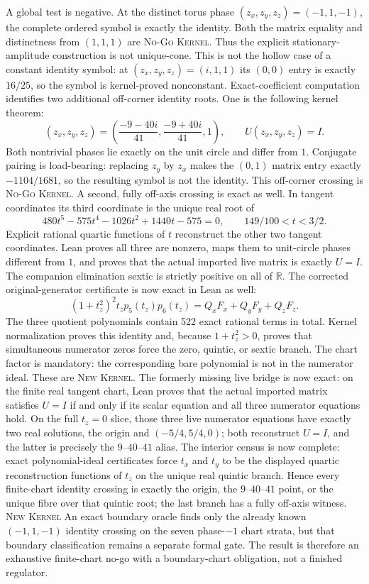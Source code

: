 \documentclass[11pt]{article}
\newcommand{\Kernel}{\textcolor{kernelcolor}{\textsc{Kernel}}}
\newcommand{\NewResult}{\textsc{New}}
\newcommand{\NoGo}{\textsc{No-Go}}
\begin{document}
A global test is negative.  At the distinct torus phase
$(z_x,z_y,z_z)=(-1,1,-1)$, the complete ordered symbol is exactly the identity.
Both the matrix equality and distinctness from $(1,1,1)$ are \NoGo{}
\Kernel{}.  Thus the explicit stationary-amplitude construction is not
unique-cone.  This is not the hollow case of a constant identity symbol: at
$(z_x,z_y,z_z)=(i,1,1)$ its $(0,0)$ entry is exactly $16/25$, so the symbol is
kernel-proved nonconstant.  Exact-coefficient computation identifies two
additional off-corner identity roots.  One is the following kernel theorem:
\[
 (z_x,z_y,z_z)=
 \left(\frac{-9-40i}{41},\frac{-9+40i}{41},1\right),
 \qquad U(z_x,z_y,z_z)=I.
\]
Both nontrivial phases lie exactly on the unit circle and differ from $1$.
Conjugate pairing is load-bearing: replacing $z_y$ by $z_x$ makes the
$(0,1)$ matrix entry exactly $-1104/1681$, so the resulting symbol is not the
identity.  This off-corner crossing is \NoGo{} \Kernel{}.  A second, fully
off-axis crossing is exact as well.  In tangent coordinates its third
coordinate is the unique real root of
\[
  480t^5-575t^4-1026t^2+1440t-575=0,
  \qquad 149/100<t<3/2.
\]
Explicit rational quartic functions of $t$ reconstruct the other two tangent
coordinates.  Lean proves all three are nonzero, maps them to unit-circle
phases different from $1$, and proves that the actual imported live matrix is
exactly $U=I$.  The companion elimination sextic is strictly positive on all
of $\mathbb R$.  The corrected original-generator certificate is now exact in
Lean as well:
\[
 (1+t_z^2)^2 t_z p_5(t_z)p_6(t_z)
   =Q_xF_x+Q_yF_y+Q_zF_z.
\]
The three quotient polynomials contain 522 exact rational terms in total.
Kernel normalization proves this identity and, because $1+t_z^2>0$, proves
that simultaneous numerator zeros force the zero, quintic, or sextic branch.
The chart factor is mandatory: the corresponding bare polynomial is not in
the numerator ideal.  These are \NewResult{} \Kernel{}.  The formerly missing
live bridge is now exact: on the finite real tangent chart, Lean proves that
the actual imported matrix satisfies $U=I$ if and only if its scalar equation
and all three numerator equations hold.  On the full $t_z=0$ slice, those
three live numerator equations have exactly two real solutions, the origin
and $(-5/4,5/4,0)$; both reconstruct $U=I$, and the latter is precisely the
$9$--$40$--$41$ alias.  The interior census is now complete: exact
polynomial-ideal certificates force $t_x$ and $t_y$ to be the displayed
quartic reconstruction functions of $t_z$ on the unique real quintic branch.
Hence every finite-chart identity crossing is exactly the origin, the
$9$--$40$--$41$ point, or the unique fibre over that quintic root; the last
branch has a fully off-axis witness.  \NewResult{} \Kernel{}  An exact boundary
oracle finds only the already known $(-1,1,-1)$ identity crossing on the seven
phase-$-1$ chart strata, but that boundary classification remains a separate
formal gate.  The result is therefore an exhaustive finite-chart no-go with a
boundary-chart obligation, not a finished regulator.
\end{document}
